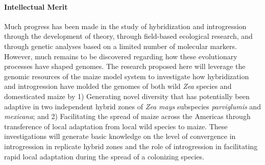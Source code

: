 
%

\paragraph{Intellectual Merit}  Much progress has been made in the study of hybridization and introgression through the development of theory, through field-based ecological research, and through genetic analyses based on a limited number of molecular markers. However, much remains to be discovered regarding how these evolutionary processes have shaped genomes. The research proposed here will leverage the genomic resources of the maize model system to investigate how hybridization and introgression have molded the genomes of both wild \emph{Zea} species and domesticated maize by 1) Generating novel diversity that has potentially been adaptive in two independent hybrid zones of \emph{Zea mays} subspecies \emph{parviglumis} and \emph{mexicana}; and 2) Facilitating the spread of maize across the Americas through transference of local adaptation from local wild species to maize. These investigations will generate basic knowledge on the level of convergence in introgression in replicate hybrid zones and the role of introgression in facilitating rapid local adaptation during the spread of a colonizing species.


